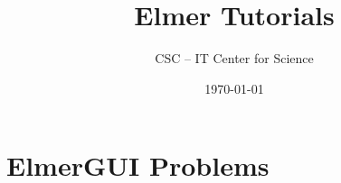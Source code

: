 \documentclass[a4paper,english]{report}    %
\title{\Huge{\bf Elmer Tutorials}}
\author{CSC -- IT Center for Science}
\date{\today}
\begin{document}
\maketitle





\pagestyle{empty}

\setcounter{secnumdepth}{2}
\setcounter{tocdepth}{1}  %

\tableofcontents


\newpage

\renewcommand{\chaptername}{Tutorial}

\pagestyle{fancy}
\fancyhead{}
\fancyhead[LE,LO]{\bfseries \rightmark}
\fancyhead[RE,RO]{\bfseries \thepage}
\fancyfoot{}
\renewcommand{\headrulewidth}{0.4pt}
\renewcommand{\footrulewidth}{0.4pt}

\clearpage

\part{ElmerGUI Problems}

\graphicspath{{./}{TemperatureGeneric/}}


\graphicspath{{./}{ElasticBeam3D/}}


\graphicspath{{./}{FlowStepGUI/}}


\graphicspath{{./}{FlowStepKe/}}


\graphicspath{{./}{RayleighBenardGUI/}}


\graphicspath{{./}{FringeCapacitance/}}



%
\end{document}
